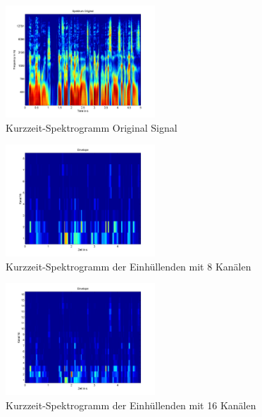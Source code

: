 \documentclass[conference]{IEEEtran}
\begin{document}
\begin{compactenum}[a)]
\begin{figure}[h!]
	\vspace{-5pt}
	\centering
	\includegraphics[width=0.5\textwidth]{img/spec_orig.png}
	\vspace{-10pt}
	\caption{Kurzzeit-Spektrogramm Original Signal}
	\vspace{-10pt}
	\label{fig:spec_orig}
\end{figure}
\begin{figure}[h!]
	\vspace{-5pt}
	\centering
	\includegraphics[width=0.5\textwidth]{img/spec_env8.png}
	\vspace{-10pt}
	\caption{Kurzzeit-Spektrogramm der Einhüllenden mit 8 Kanälen}
	\vspace{-10pt}
	\label{fig:spec_env8}
\end{figure}
\begin{figure}[h!]
	\vspace{-5pt}
	\centering
	\includegraphics[width=0.5\textwidth]{img/spec_env16.png}
	\vspace{-10pt}
	\caption{Kurzzeit-Spektrogramm der Einhüllenden mit 16 Kanälen}
	\vspace{-10pt}
	\label{fig:spec_env16}
\end{figure}


\end{compactenum}
\end{document}
